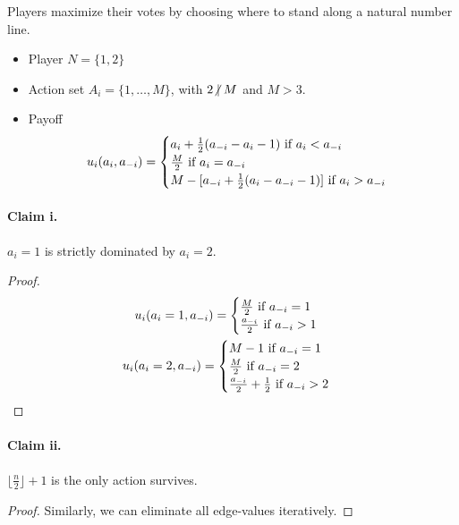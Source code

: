 \documentclass[11pt]{article}
\newcommand{\floor}[1]{\lfloor #1 \rfloor}
\begin{document}
			\begin{example}
				Players maximize their votes by choosing where to stand along a natural number line.
				\begin{itemize}
					\item Player $N = \{1,2\}$
					\item Action set $A_i = \{1, \dots, M\}$, with $2 \centernot | M$ and $M > 3$.
					\item Payoff
					\begin{equation}
						u_i(a_i, a_{-i}) = \begin{cases}
							a_i + \frac{1}{2}(a_{-i} - a_{i} - 1) \text{{ if }} a_i < a_{-i} \\
							\frac{M}{2} \text{{ if }} a_i = a_{-i} \\
							M - [a_{-i} + \frac{1}{2}(a_{i} - a_{-i} - 1)] \text{{ if }} a_i > a_{-i}
						\end{cases}
					\end{equation}
				\end{itemize}
				\paragraph{Claim i.} $a_i=1$ is strictly dominated by $a_i=2$.
				\begin{proof}
					\begin{gather}
						u_i(a_i=1, a_{-i}) =
						\begin{cases}
							\frac{M}{2} \text{{ if }} a_{-i} = 1 \\
							\frac{a_{-i}}{2} \text{{ if }} a_{-i} > 1
						\end{cases} \\
						u_i(a_i=2, a_{-i}) = 
						\begin{cases}
							M - 1 \text{{ if }} a_{-i} = 1 \\
							\frac{M}{2} \text{{ if }} a_{-i} = 2 \\
							\frac{a_{-i}}{2} + \frac{1}{2} \text{{ if }} a_{-i} > 2
						\end{cases}
					\end{gather}
				\end{proof}
				\paragraph{Claim ii.} $\floor{\frac{n}{2}} + 1$ is the only action survives.
				\begin{proof}
					Similarly, we can eliminate all edge-values iteratively.
				\end{proof}
			\end{example}
			
\end{document}
